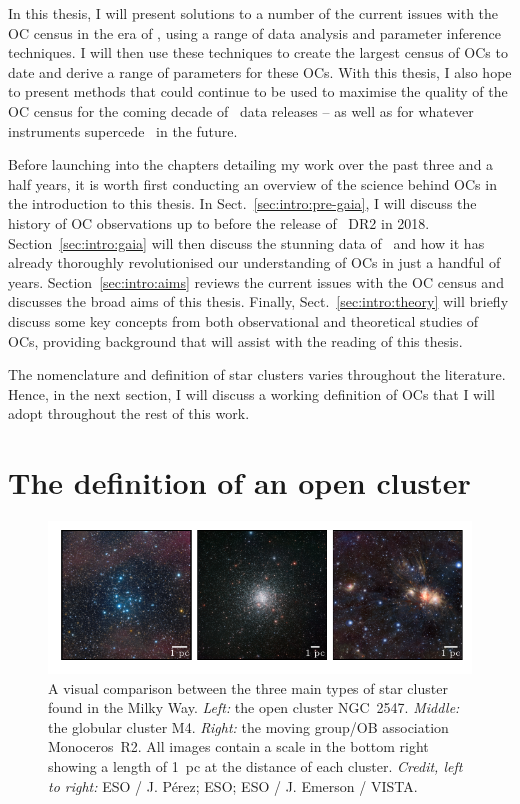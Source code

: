 In this thesis, I will present solutions to a number of the current issues with the OC census in the era of \gaia, using a range of data analysis and parameter inference techniques. I will then use these techniques to create the largest census of OCs to date and derive a range of parameters for these OCs. With this thesis, I also hope to present methods that could continue to be used to maximise the quality of the OC census for the coming decade of \gaia\ data releases -- as well as for whatever instruments supercede \gaia\ in the future.

Before launching into the chapters detailing my work over the past three and a half years, it is worth first conducting an overview of the science behind OCs in the introduction to this thesis. In Sect.~\ref{sec:intro:pre-gaia}, I will discuss the history of OC observations up to before the release of \gaia\ DR2 in 2018. Section~\ref{sec:intro:gaia} will then discuss the stunning data of \gaia\ and how it has already thoroughly revolutionised our understanding of OCs in just a handful of years. Section~\ref{sec:intro:aims} reviews the current issues with the OC census and discusses the broad aims of this thesis. Finally, Sect.~\ref{sec:intro:theory} will briefly discuss some key concepts from both observational and theoretical studies of OCs, providing background that will assist with the reading of this thesis.

The nomenclature and definition of star clusters varies throughout the literature. Hence, in the next section, I will discuss a working definition of OCs that I will adopt throughout the rest of this work.


\section{The definition of an open cluster}
\label{sec:intro:definition}

\begin{figure}[tb]
	\includegraphics[width=\textwidth]{fig/c1/oc_gc_mg_comparison.pdf}
	\caption[A visual comparison between the three main types of star cluster found in the Milky Way]{A visual comparison between the three main types of star cluster found in the Milky Way. \emph{Left:} the open cluster NGC~2547. \emph{Middle:} the globular cluster M4. \emph{Right:} the moving group/OB association Monoceros~R2. All images contain a scale in the bottom right showing a length of 1~pc at the distance of each cluster. \emph{Credit, left to right:} ESO / J. Pérez; ESO; ESO / J. Emerson / VISTA. }
	\label{fig:intro:definition:comparison}
\end{figure}


